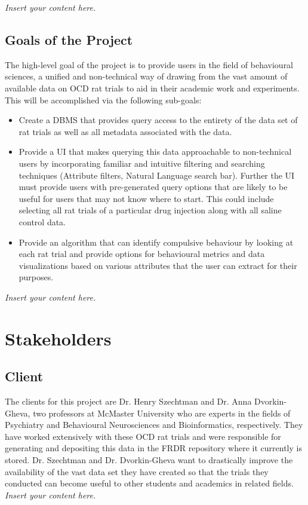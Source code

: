 \documentclass[12pt]{article}
\newcommand{\lips}{\textit{Insert your content here.}}
\begin{document}
\lips
\subsection{Goals of the Project}

\par{The high-level goal of the project is to provide users in the field of behavioural sciences,
a unified and non-technical way of drawing from the vast amount of available data on OCD rat trials
to aid in their academic work and experiments. This will be accomplished via the following sub-goals:}

\begin{itemize}
    \item Create a DBMS that provides query access to the entirety of the data set of rat trials as well as all metadata associated with the data.
    \item Provide a UI that makes querying this data approachable to non-technical users by incorporating familiar and intuitive filtering and searching techniques
    (Attribute filters, Natural Language search bar). Further the UI must provide users with pre-generated query options that are likely to
    be useful for users that may not know where to start. This could include selecting all rat trials of a particular drug injection along with
    all saline control data.
    \item Provide an algorithm that can identify compulsive behaviour by looking at each rat trial
    and provide options for behavioural metrics and data visualizations based on various attributes that the user can extract 
    for their purposes.
\end{itemize}


\lips
\section{Stakeholders}
\subsection{Client}

\par{The clients for this project are Dr. Henry Szechtman and Dr. Anna Dvorkin-Gheva, two professors at McMaster University who are experts in
the fields of Psychiatry and Behavioural Neurosciences and Bioinformatics, respectively. They have worked extensively with these OCD rat trials and
were responsible for generating and depositing this data in the FRDR repository where it currently is stored. Dr. Szechtman and Dr. Dvorkin-Gheva want
to drastically improve the availability of the vast data set they have created so that the trials they conducted can become useful to other students and academics in related fields.}
\lips
\end{document}
